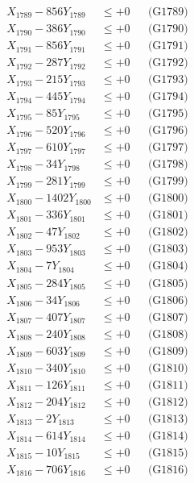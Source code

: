 \documentclass[a4paper,10pt]{article}
\begin{document}
{\begin{align}
X_{1789} - 856Y_{1789} &\leq +0 && \text{(G1789)} \\
X_{1790} - 386Y_{1790} &\leq +0 && \text{(G1790)} \\
\allowbreak
X_{1791} - 856Y_{1791} &\leq +0 && \text{(G1791)} \\
X_{1792} - 287Y_{1792} &\leq +0 && \text{(G1792)} \\
X_{1793} - 215Y_{1793} &\leq +0 && \text{(G1793)} \\
X_{1794} - 445Y_{1794} &\leq +0 && \text{(G1794)} \\
X_{1795} - 85Y_{1795} &\leq +0 && \text{(G1795)} \\
X_{1796} - 520Y_{1796} &\leq +0 && \text{(G1796)} \\
X_{1797} - 610Y_{1797} &\leq +0 && \text{(G1797)} \\
X_{1798} - 34Y_{1798} &\leq +0 && \text{(G1798)} \\
X_{1799} - 281Y_{1799} &\leq +0 && \text{(G1799)} \\
X_{1800} - 1402Y_{1800} &\leq +0 && \text{(G1800)} \\
\allowbreak
X_{1801} - 336Y_{1801} &\leq +0 && \text{(G1801)} \\
X_{1802} - 47Y_{1802} &\leq +0 && \text{(G1802)} \\
X_{1803} - 953Y_{1803} &\leq +0 && \text{(G1803)} \\
X_{1804} - 7Y_{1804} &\leq +0 && \text{(G1804)} \\
X_{1805} - 284Y_{1805} &\leq +0 && \text{(G1805)} \\
X_{1806} - 34Y_{1806} &\leq +0 && \text{(G1806)} \\
X_{1807} - 407Y_{1807} &\leq +0 && \text{(G1807)} \\
X_{1808} - 240Y_{1808} &\leq +0 && \text{(G1808)} \\
X_{1809} - 603Y_{1809} &\leq +0 && \text{(G1809)} \\
X_{1810} - 340Y_{1810} &\leq +0 && \text{(G1810)} \\
\allowbreak
X_{1811} - 126Y_{1811} &\leq +0 && \text{(G1811)} \\
X_{1812} - 204Y_{1812} &\leq +0 && \text{(G1812)} \\
X_{1813} - 2Y_{1813} &\leq +0 && \text{(G1813)} \\
X_{1814} - 614Y_{1814} &\leq +0 && \text{(G1814)} \\
X_{1815} - 10Y_{1815} &\leq +0 && \text{(G1815)} \\
X_{1816} - 706Y_{1816} &\leq +0 && \text{(G1816)} \\

\end{align}}
\end{document}
